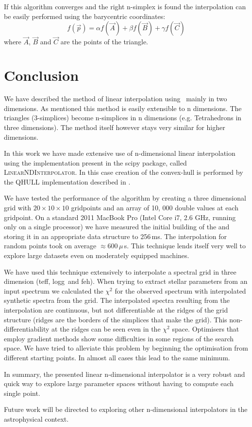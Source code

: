 If this algorithm converges and the right n-simplex is found the interpolation can be easily performed using the barycentric coordinates:
\[
f(\vec{p})=\alpha f(\vec{A}) + \beta f(\vec{B}) + \gamma f(\vec{C})
\]
where  $\vec{A}$, $\vec{B}$ and $\vec{C}$ are the points of the triangle. 


\section{Conclusion}

We have described the method of linear interpolation using \deltri\ mainly in two dimensions. As mentioned this method is easily extensible to n dimensions. The triangles (3-simplices) become n-simplices in n dimensions (e.g. Tetrahedrons in three dimensions). The method itself however stays very similar for higher dimensions. 

In this work we have made extensive use of n-dimensional linear interpolation using the implementation present in the \gls{scipy} package, called \textsc{LinearNDInterpolator}. In this case creation of the convex-hull is performed by the QHULL implementation described in \citet{Barber96thequickhull}.

We have tested the performance of the algorithm by creating a three dimensional grid with $20\times10\times10$ gridpoints and an array of 10, 000  double values at each gridpoint. 
On a standard 2011 MacBook Pro (Intel Core i7, 2.6 GHz, running only on a single processor) we have measured the initial building of the \deltri and storing it in an appropriate data structure to 256\,ms. The interpolation for random points took on average $\approx600\,\mu$\,s. This technique lends itself very well to explore large datasets even on moderately equipped machines. 

We have used this technique extensively to interpolate a spectral grid in three dimension (\gls{teff}, \gls{logg}\ and \gls{feh}). When trying to extract stellar parameters from an input spectrum we calculated the $\chi^2$ for the observed spectrum with interpolated synthetic spectra from the grid. The interpolated spectra resulting from the interpolation are continuous, but not differentiable at the ridges of the grid structure (ridges are the borders of the simplices that make the grid). This non-differentiability at the ridges can be seen even in the $\chi^2$ space. Optimisers that employ gradient methods \citep[such as MIGRAD][]{James:1975dr} show some difficulties in some regions of the search space. We have tried to alleviate this problem by beginning the optimisation from different starting points. In almost all cases this lead to the same minimum.

In summary, the presented linear n-dimensional interpolator is a very robust and quick way to explore large parameter spaces without having to compute each single point. 

Future work will be directed to exploring other n-dimensional interpolators in the astrophysical context. 

